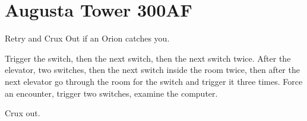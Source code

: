 \chapter{Augusta Tower 300AF}

Retry and Crux Out if an Orion catches you.

Trigger the switch, then the next switch, then the next switch twice. After the elevator, two switches, then the next switch inside the room twice, then after the next elevator go through the room for the switch and trigger it three times. Force an encounter, trigger two switches, examine the computer.

\livet{[]}

Crux out.
\newline